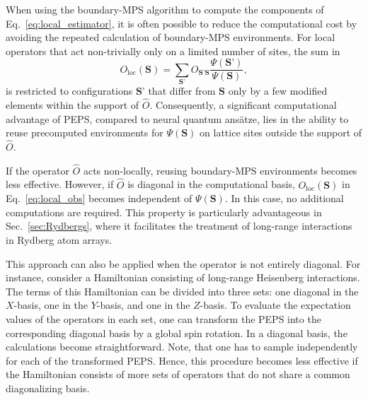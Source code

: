 \documentclass[aps,notitlepage,twocolumn,nofootinbib,superscriptaddress,pra,10pt]{revtex4-2}
\begin{document}
When using the boundary-MPS algorithm to compute the components of Eq.~\eqref{eq:local_estimator}, it is often possible to reduce the computational cost by avoiding the repeated calculation of boundary-MPS environments. For local operators that act non-trivially only on a limited number of sites, the sum in
\begin{equation}
    O_\text{loc}(\textbf{S})= \sum_{\textbf{S'}}O_{\textbf{S'}\textbf{S}}\frac{\Psi(\textbf{S'})}{\Psi(\textbf{S})}, \label{eq:local_obs}
\end{equation}
is restricted to configurations $\textbf{S'}$ that differ from $\textbf{S}$ only by a few modified elements within the support of $\hat{O}$. Consequently, a significant computational advantage of PEPS, compared to neural quantum ansätze, lies in the ability to reuse precomputed environments for $\Psi(\textbf{S})$ on lattice sites outside the support of $\hat{O}$.

If the operator $\hat{O}$ acts non-locally, reusing boundary-MPS environments becomes less effective. However, if $\hat{O}$ is diagonal in the computational basis, $O_\text{loc}(\mathbf{S})$ in Eq.~\eqref{eq:local_obs} becomes independent of $\Psi(\textbf{S})$. In this case, no additional computations are required. This property is particularly advantageous in Sec.~\ref{sec:Rydbergs}, where it facilitates the treatment of long-range interactions in Rydberg atom arrays.

This approach can also be applied when the operator is not entirely diagonal. For instance, consider a Hamiltonian consisting of long-range Heisenberg interactions. The terms of this Hamiltonian can be divided into three sets: one diagonal in the $X$-basis, one in the $Y$-basis, and one in the $Z$-basis.
To evaluate the expectation values of the operators in each set, one can transform the PEPS into the corresponding diagonal basis by a global spin rotation. In a diagonal basis, the calculations become straightforward. Note, that one has to sample independently for each of the transformed PEPS.
Hence, this procedure becomes less effective if the Hamiltonian consists of more sets of operators that do not share a common diagonalizing basis.
\end{document}
